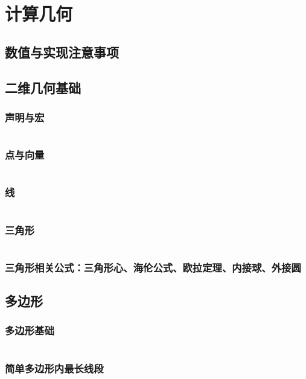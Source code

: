 \section{计算几何}

\subsection{数值与实现注意事项}
	

\subsection{二维几何基础}
	\subsubsection{声明与宏}
		\inputminted{cpp}{sections/ComputationalGeometry/assets/Geometry/8.1-declarations.cpp}
	\subsubsection{点与向量}
		\inputminted{cpp}{sections/ComputationalGeometry/assets/Geometry/8.2-point-vector.cpp}
	\subsubsection{线}
		\inputminted{cpp}{sections/ComputationalGeometry/assets/Geometry/8.3-line.cpp}
	\subsubsection{三角形}
		\inputminted{cpp}{sections/ComputationalGeometry/assets/Geometry/三角形.cpp}
	\subsubsection{三角形相关公式：三角形心、海伦公式、欧拉定理、内接球、外接圆}
		

\subsection{多边形}
	\subsubsection{多边形基础}
		\inputminted{cpp}{sections/ComputationalGeometry/assets/Geometry/多边形基础.cpp}
	\subsubsection{简单多边形内最长线段}
		\inputminted{cpp}{sections/ComputationalGeometry/assets/Geometry/AirportConstruction.cpp}
